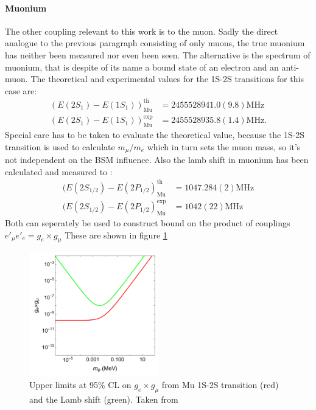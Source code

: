 \paragraph{Muonium}
The other coupling relevant to this work is to the muon. Sadly the direct analogue to the previous paragraph consisting of only muons, the true muonium has neither been measured nor even been seen. The alternative is the spectrum of muonium, that is despite of its name a bound state of an electron and an anti-muon. The theoretical and experimental values for the 1S-2S transitions for this case are:
\begin{align}
(E(2S_1)-E(1S_1))_{\text{Mu}}^\text{th}&=2455528941.0(9.8)\text{MHz}\\
(E(2S_1)-E(1S_1))_{\text{Mu}}^\text{exp}&=2455528935.8(1.4) \text{MHz}.
\end{align}
Special care has to be taken to evaluate the theoretical value, because the 1S-2S transition is used to calculate $m_\mu/m_e$ which in turn sets the muon mass, so it's not independent on the BSM influence. 
Also the lamb shift in muonium has been calculated and measured to :
\begin{align*}
(E(2S_{1/2})-E(2P_{1/2})_\text{Mu}^\text{th}&=1047.284(2)\text{MHz}\\
(E(2S_{1/2})-E(2P_{1/2})_\text{Mu}^\text{exp}&=1042(22)\text{MHz}
\end{align*}
Both can seperately be used to construct bound on the product of couplings $e'_\mu e'_e=g_e\times g_\mu$ \cite{Frugiuele:2019drl} These are shown in figure \ref{fg:MuoniumBounds}
\begin{figure}[H]
  \centering
    \includegraphics[width=0.5\textwidth]{imgs/muonium1}
    \caption{Upper limits at 95\% CL on $g_e\times g_\mu$ from Mu 1S-2S transition (red) and the Lamb shift (green). Taken from \cite{Frugiuele:2019drl}}
    \label{fg:MuoniumBounds}
\end{figure}
